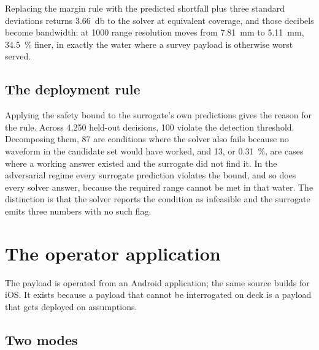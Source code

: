 \documentclass[conference,a4paper]{IEEEtran}
\begin{document}
Replacing the margin rule with the predicted shortfall plus three standard
deviations returns \SI{3.66}{\decibel} to the solver at equivalent coverage,
and those decibels become bandwidth: at \SI{1000}{\NTU} range resolution moves
from \SI{7.81}{\milli\metre} to \SI{5.11}{\milli\metre},
\SI{34.5}{\percent} finer, in exactly the water where a survey payload is
otherwise worst served.

\subsection{The deployment rule}


Applying the safety bound to the surrogate's own predictions gives the reason
for the rule. Across 4{,}250 held-out decisions, 100 violate the detection
threshold. Decomposing them, 87 are conditions where the solver also fails
because no waveform in the candidate set would have worked, and 13, or
\SI{0.31}{\percent}, are cases where a working answer existed and the surrogate
did not find it. In the adversarial regime every surrogate prediction violates
the bound, and so does every solver answer, because the required range cannot
be met in that water. The distinction is that the solver reports the condition
as infeasible and the surrogate emits three numbers with no such flag.

\section{The operator application}
\label{sec:app}

The payload is operated from an Android application; the same source builds for
iOS. It exists because a payload that cannot be interrogated on deck is a
payload that gets deployed on assumptions.

\subsection{Two modes}
\end{document}

